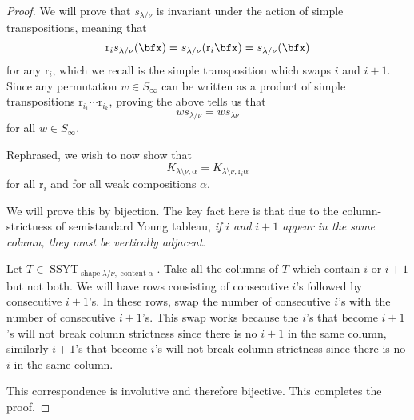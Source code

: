 \documentclass{article}
\DeclareMathOperator{\shape}{shape}
\DeclareMathOperator{\content}{content}
\DeclareMathOperator{\SSYT}{SSYT}
\newcommand*\refl{\ensuremath{\text{r}}}
\begin{document}
\begin{proof}
    We will prove that $s_{\lambda/\nu}$ is invariant under the action of simple transpositions, meaning that
    \[
        \refl_i s_{\lambda/\nu} (\bfx)
        = 
        s_{\lambda/\nu} (\refl_i \bfx)
        =
        s_{\lambda/\nu} (\bfx)
    \]
    for any $\refl_i$, which we recall is the simple transposition which swaps $i$ and $i+1$.
    Since any permutation $w \in S_\infty$ can be written as a product of simple transpositions $\refl_{i_1}\cdots \refl_{i_k}$, proving the above tells us that 
    \[
        ws_{\lambda/\nu} 
        = 
        ws_{\lambda\nu}
    \]
    for all $w \in S_\infty$.

    Rephrased, we wish to now show that 
    \[
        K_{\lambda\setminus\nu,\alpha} 
        = 
        K_{\lambda\setminus\nu,\refl_i\alpha}
    \]
    for all $\refl_i$ and for all weak compositions $\alpha$.

    We will prove this by bijection.
    The key fact here is that due to the column-strictness of semistandard Young tableau, \textit{if $i$ and $i+1$ appear in the same column, they must be vertically adjacent}. 

    Let $T\in\SSYT_{\shape \lambda/\nu,\content \alpha}$. 
    Take all the columns of $T$ which contain $i$ or $i+1$ but not both. 
    We will have rows consisting of consecutive $i$'s followed by consecutive $i+1$'s. 
    In these rows, swap the number of consecutive $i$'s with the number of consecutive $i+1$'s. 
    This swap works because the $i$'s that become $i+1$'s will not break column strictness since there is no $i+1$ in the same column, similarly $i+1$'s that become $i$'s will not break column strictness since there is no $i$ in the same column.

    This correspondence is involutive and therefore bijective. This completes the proof.
\end{proof}
\end{document}
